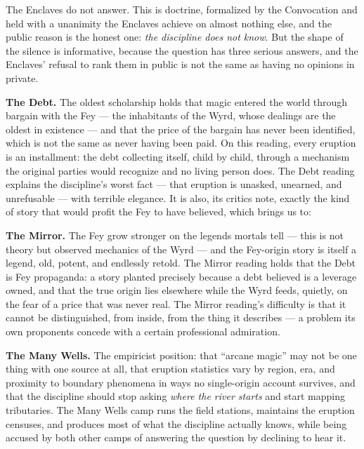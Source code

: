 The Enclaves do not answer. This is doctrine, formalized by the Convocation and held with a unanimity the Enclaves achieve on almost nothing else, and the public reason is the honest one: \textit{the discipline does not know}. But the shape of the silence is informative, because the question has three serious answers, and the Enclaves' refusal to rank them in public is not the same as having no opinions in private.

\textbf{The Debt.} The oldest scholarship holds that magic entered the world through bargain with the Fey --- the inhabitants of the Wyrd, whose dealings are the oldest in existence --- and that the price of the bargain has never been identified, which is not the same as never having been paid. On this reading, every eruption is an installment: the debt collecting itself, child by child, through a mechanism the original parties would recognize and no living person does. The Debt reading explains the discipline's worst fact --- that eruption is unasked, unearned, and unrefusable --- with terrible elegance. It is also, its critics note, exactly the kind of story that would profit the Fey to have believed, which brings us to:

\textbf{The Mirror.} The Fey grow stronger on the legends mortals tell --- this is not theory but observed mechanics of the Wyrd --- and the Fey-origin story is itself a legend, old, potent, and endlessly retold. The Mirror reading holds that the Debt is Fey propaganda: a story planted precisely because a debt believed is a leverage owned, and that the true origin lies elsewhere while the Wyrd feeds, quietly, on the fear of a price that was never real. The Mirror reading's difficulty is that it cannot be distinguished, from inside, from the thing it describes --- a problem its own proponents concede with a certain professional admiration.

\textbf{The Many Wells.} The empiricist position: that ``arcane magic'' may not be one thing with one source at all, that eruption statistics vary by region, era, and proximity to boundary phenomena in ways no single-origin account survives, and that the discipline should stop asking \textit{where the river starts} and start mapping tributaries. The Many Wells camp runs the field stations, maintains the eruption censuses, and produces most of what the discipline actually knows, while being accused by both other camps of answering the question by declining to hear it.


